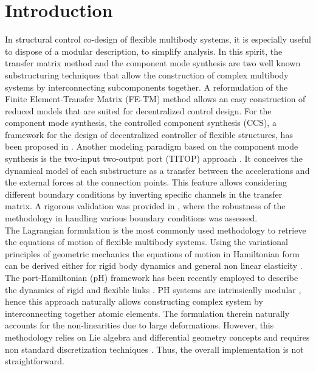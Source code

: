 \documentclass{svjour3}                     %
\newcommand{\firstRev}[1]{\textcolor{red!80!black}{#1}}
\begin{document}
	\section{Introduction}
	\label{intro}
	\indent In structural control co-design of flexible multibody systems, it is especially useful to dispose of a modular description, to simplify analysis. In this spirit, the transfer matrix method \cite{Rui2005} and the component mode synthesis \cite{HurtyCMS} are two well known substructuring techniques that allow the construction of complex multibody systems by interconnecting subcomponents together. A reformulation of the Finite Element-Transfer Matrix (FE-TM) method \cite{TAN199047} allows an easy construction of reduced models that are suited for decentralized control design. For the component mode synthesis, the controlled component synthesis (CCS), a framework for the design of decentralized controller of flexible structures, has been proposed in \cite{YoungCMS}. Another modeling paradigm based on the component mode synthesis is the two-input two-output port (TITOP) approach \cite{TITOP}. It conceives the dynamical model of each substructure as a transfer between the accelerations and the external forces at the connection points. This feature allows considering different boundary conditions by inverting specific channels in the transfer matrix. A rigorous validation was provided in \cite{Perez,SANFEDINO2018128}, where the robustness of the methodology in handling various boundary conditions was assessed. \\
	\indent The Lagrangian formulation is the most commonly used methodology to retrieve the equations of motion of flexible multibody systems. \firstRev{Using the variational principles of geometric mechanics the equations of motion in Hamiltonian form can be derived either for rigid body dynamics \cite[Proposition 7.1.1]{holm2008geometric} and general non linear elasticity \cite[Chapter 3]{marsden1981lectures}.} The port-Hamiltonian (pH) framework \cite{bookPHs} has been recently employed to describe the dynamics of rigid and flexible links \cite{macchelli_fl,macchelli_flrig}. PH systems are intrinsically modular \cite{CerveraIntFinite}, hence this approach naturally allows constructing complex system by interconnecting together atomic elements. The formulation therein naturally accounts for the non-linearities due to large deformations.  However, this methodology relies on Lie algebra and differential geometry concepts and requires non standard discretization techniques \cite{Golo}. Thus, the overall implementation is not straightforward. \\
\end{document}
